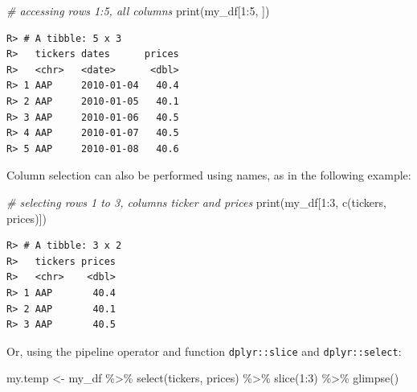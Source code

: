 \documentclass[
  12pt,
]{book}
\newenvironment{Shaded}{\begin{snugshade}}{\end{snugshade}}
\newcommand{\CommentTok}[1]{\textcolor[rgb]{0.37,0.37,0.37}{\textit{#1}}}
\newcommand{\DecValTok}[1]{\textcolor[rgb]{0.06,0.06,0.06}{#1}}
\newcommand{\FunctionTok}[1]{\textcolor[rgb]{0,0,0}{#1}}
\newcommand{\NormalTok}[1]{#1}
\newcommand{\OtherTok}[1]{\textcolor[rgb]{0.37,0.37,0.37}{#1}}
\newcommand{\SpecialCharTok}[1]{\textcolor[rgb]{0,0,0}{#1}}
\newcommand{\StringTok}[1]{\textcolor[rgb]{0.5,0.5,0.5}{#1}}
\begin{document}
\begin{Shaded}
\begin{Highlighting}[]
\CommentTok{\# accessing rows 1:5, all columns}
\FunctionTok{print}\NormalTok{(my\_df[}\DecValTok{1}\SpecialCharTok{:}\DecValTok{5}\NormalTok{, ])}
\end{Highlighting}
\end{Shaded}

\begin{verbatim}
R> # A tibble: 5 x 3
R>   tickers dates      prices
R>   <chr>   <date>      <dbl>
R> 1 AAP     2010-01-04   40.4
R> 2 AAP     2010-01-05   40.1
R> 3 AAP     2010-01-06   40.5
R> 4 AAP     2010-01-07   40.5
R> 5 AAP     2010-01-08   40.6
\end{verbatim}

Column selection can also be performed using names, as in the following example:

\begin{Shaded}
\begin{Highlighting}[]
\CommentTok{\# selecting rows 1 to 3, columns \textquotesingle{}ticker\textquotesingle{} and \textquotesingle{}prices\textquotesingle{}}
\FunctionTok{print}\NormalTok{(my\_df[}\DecValTok{1}\SpecialCharTok{:}\DecValTok{3}\NormalTok{, }\FunctionTok{c}\NormalTok{(}\StringTok{\textquotesingle{}tickers\textquotesingle{}}\NormalTok{, }\StringTok{\textquotesingle{}prices\textquotesingle{}}\NormalTok{)])}
\end{Highlighting}
\end{Shaded}

\begin{verbatim}
R> # A tibble: 3 x 2
R>   tickers prices
R>   <chr>    <dbl>
R> 1 AAP       40.4
R> 2 AAP       40.1
R> 3 AAP       40.5
\end{verbatim}

Or, using the pipeline operator and function \texttt{dplyr::slice} and \texttt{dplyr::select}: 

\begin{Shaded}
\begin{Highlighting}[]
\NormalTok{my.temp }\OtherTok{\textless{}{-}}\NormalTok{ my\_df }\SpecialCharTok{\%\textgreater{}\%}
  \FunctionTok{select}\NormalTok{(tickers, prices) }\SpecialCharTok{\%\textgreater{}\%}
  \FunctionTok{slice}\NormalTok{(}\DecValTok{1}\SpecialCharTok{:}\DecValTok{3}\NormalTok{) }\SpecialCharTok{\%\textgreater{}\%}
  \FunctionTok{glimpse}\NormalTok{()}
\end{Highlighting}
\end{Shaded}
\end{document}

